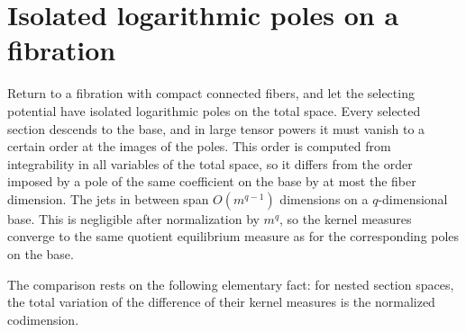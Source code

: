\section{Isolated logarithmic poles on a fibration}
\label{sec:fiber-point-kernels}

Return to a fibration with compact connected fibers, and let the selecting potential have isolated logarithmic poles on the total space. Every selected section descends to the base, and in large tensor powers it must vanish to a certain order at the images of the poles. This order is computed from integrability in all variables of the total space, so it differs from the order imposed by a pole of the same coefficient on the base by at most the fiber dimension. The jets in between span $O(m^{q-1})$ dimensions on a $q$-dimensional base. This is negligible after normalization by $m^q$, so the kernel measures converge to the same quotient equilibrium measure as for the corresponding poles on the base.

The comparison rests on the following elementary fact: for nested section spaces, the total variation of the difference of their kernel measures is the normalized codimension.

